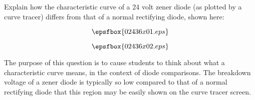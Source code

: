 

Explain how the characteristic curve of a 24 volt zener diode (as plotted by a curve tracer) differs from that of a normal rectifying diode, shown here:

$$\epsfbox{02436x01.eps}$$







$$\epsfbox{02436x02.eps}$$







The purpose of this question is to cause students to think about what a characteristic curve means, in the context of diode comparisons.  The breakdown voltage of a zener diode is typically so low compared to that of a normal rectifying diode that this region may be easily shown on the curve tracer screen.




